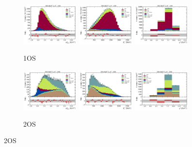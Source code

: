 \begin{figure}[htb]
    \centering
    \begin{subfigure}{\textwidth}
        \includegraphics[width=0.32\textwidth]{./figs-supplemental-plots/init-fit/ctrl/fit_result-stacked-Dst-1os-mmiss2.pdf}
        \includegraphics[width=0.32\textwidth]{./figs-supplemental-plots/init-fit/ctrl/fit_result-stacked-Dst-1os-el.pdf}
        \includegraphics[width=0.32\textwidth]{./figs-supplemental-plots/init-fit/ctrl/fit_result-stacked-Dst-1os-q2.pdf}
        \caption{1OS}
    \end{subfigure}

    \begin{subfigure}{\textwidth}
        \includegraphics[width=0.32\textwidth]{./figs-supplemental-plots/init-fit/ctrl/fit_result-stacked-Dst-2os-mmiss2.pdf}
        \includegraphics[width=0.32\textwidth]{./figs-supplemental-plots/init-fit/ctrl/fit_result-stacked-Dst-2os-el.pdf}
        \includegraphics[width=0.32\textwidth]{./figs-supplemental-plots/init-fit/ctrl/fit_result-stacked-Dst-2os-q2.pdf}
        \caption{2OS}
    \end{subfigure}


\end{figure}
